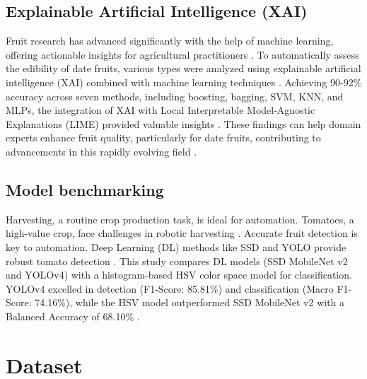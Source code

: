 \documentclass[a4paper,oneside,11pt]{book}
\begin{document}
\section{Explainable Artificial Intelligence (XAI)}
Fruit research has advanced significantly with the help of machine learning, offering actionable insights for agricultural practitioners \citep{sahidullah2023date}. To automatically assess the edibility of date fruits, various types were analyzed using explainable artificial intelligence (XAI) combined with machine learning techniques \citep{sahidullah2023date}. Achieving 90-92\% accuracy across seven methods, including boosting, bagging, SVM, KNN, and MLPs, the integration of XAI with Local Interpretable Model-Agnostic Explanations (LIME) provided valuable insights \citep{sahidullah2023date}. These findings can help domain experts enhance fruit quality, particularly for date fruits, contributing to advancements in this rapidly evolving field \citep{sahidullah2023date}.
\section{Model benchmarking}
Harvesting, a routine crop production task, is ideal for automation. Tomatoes, a high-value crop, face challenges in robotic harvesting \citep{moreira2022benchmark}. Accurate fruit detection is key to automation. Deep Learning (DL) methods like SSD and YOLO provide robust tomato detection \citep{moreira2022benchmark}. This study compares DL models (SSD MobileNet v2 and YOLOv4) with a histogram-based HSV color space model for classification. YOLOv4 excelled in detection (F1-Score: 85.81\%) and classification (Macro F1-Score: 74.16\%), while the HSV model outperformed SSD MobileNet v2 with a Balanced Accuracy of 68.10\% \citep{moreira2022benchmark}.
\chapter{Dataset}
\end{document}
